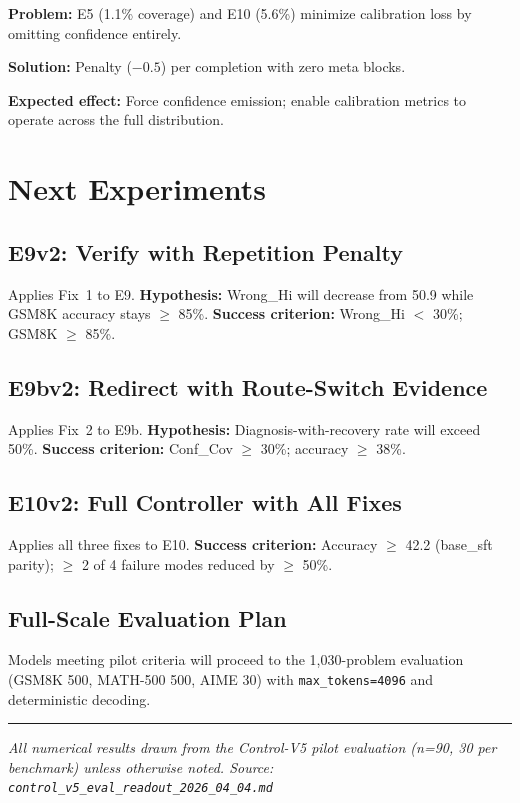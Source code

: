 \documentclass[11pt,a4paper]{article}
\newcommand{\tok}[1]{\texttt{#1}}
\begin{document}
\textbf{Problem:} E5 (1.1\% coverage) and E10 (5.6\%) minimize calibration loss by omitting confidence entirely.

\textbf{Solution:} Penalty ($-0.5$) per completion with zero meta blocks.

\textbf{Expected effect:} Force confidence emission; enable calibration metrics to operate across the full distribution.

\section{Next Experiments}

\subsection{E9v2: Verify with Repetition Penalty}

Applies Fix~1 to E9. \textbf{Hypothesis:} Wrong\_Hi will decrease from 50.9 while GSM8K accuracy stays $\geq$ 85\%. \textbf{Success criterion:} Wrong\_Hi $<$ 30\%; GSM8K $\geq$ 85\%.

\subsection{E9bv2: Redirect with Route-Switch Evidence}

Applies Fix~2 to E9b. \textbf{Hypothesis:} Diagnosis-with-recovery rate will exceed 50\%. \textbf{Success criterion:} Conf\_Cov $\geq$ 30\%; accuracy $\geq$ 38\%.

\subsection{E10v2: Full Controller with All Fixes}

Applies all three fixes to E10. \textbf{Success criterion:} Accuracy $\geq$ 42.2 (base\_sft parity); $\geq$ 2 of 4 failure modes reduced by $\geq$ 50\%.

\subsection{Full-Scale Evaluation Plan}

Models meeting pilot criteria will proceed to the 1,030-problem evaluation (GSM8K 500, MATH-500 500, AIME 30) with \tok{max\_tokens=4096} and deterministic decoding.

\vspace{1em}
\noindent\rule{\textwidth}{0.4pt}

\small
\textit{All numerical results drawn from the Control-V5 pilot evaluation (n=90, 30 per benchmark) unless otherwise noted. Source: \tok{control\_v5\_eval\_readout\_2026\_04\_04.md}}
\end{document}
